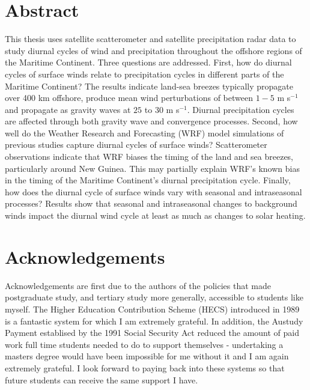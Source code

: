 \documentclass[12pt]{book}
\begin{document}
\tableofcontents


\frontmatter

\chapter{Abstract}
This thesis uses satellite scatterometer and satellite precipitation radar data to study diurnal cycles of wind and precipitation throughout the offshore regions of the Maritime Continent. Three questions are addressed. First, how do diurnal cycles of surface winds relate to precipitation cycles in different parts of the Maritime Continent? The results indicate land-sea breezes typically propagate over 400 km offshore, produce mean wind perturbations of between $1-5$ m s$^{-1}$ and propagate as gravity waves at $25$ to $30$ m s$^{-1}$. Diurnal precipitation cycles are affected through both gravity wave and convergence processes. Second, how well do the Weather Research and Forecasting (WRF) model simulations of previous studies capture diurnal cycles of surface winds? Scatterometer observations indicate that WRF biases the timing of the land and sea breezes, particularly around New Guinea. This may partially explain WRF's known bias in the timing of the Maritime Continent's diurnal precipitation cycle. Finally, how does the diurnal cycle of surface winds vary with seasonal and intraseasonal processes? Results show that seasonal and intraseasonal changes to background winds impact the diurnal wind cycle at least as much as changes to solar heating.

\chapter{Acknowledgements}
Acknowledgements are first due to the authors of the policies that made postgraduate study, and tertiary study more generally, accessible to students like myself. The Higher Education Contribution Scheme (HECS) introduced in 1989 is a fantastic system for which I am extremely grateful. In addition, the Austudy Payment establised by the 1991 Social Security Act reduced the amount of paid work full time students needed to do to support themselves - undertaking a masters degree would have been impossible for me without it and I am again extremely grateful. I look forward to paying back into these systems so that future students can receive the same support I have. 
\end{document}
